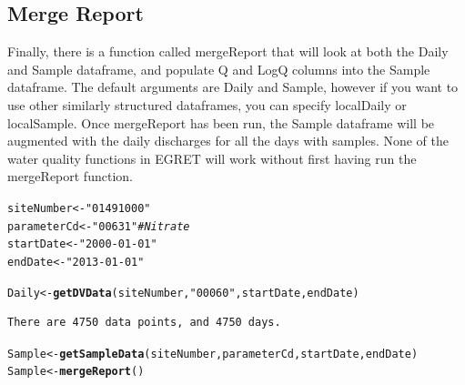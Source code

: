 \documentclass[a4paper,11pt]{article}\usepackage[]{graphicx}\usepackage[]{color}
\makeatletter
\newcommand{\hlstr}[1]{\textcolor[rgb]{0.192,0.494,0.8}{#1}}%
\newcommand{\hlcom}[1]{\textcolor[rgb]{0.678,0.584,0.686}{\textit{#1}}}%
\newcommand{\hlstd}[1]{\textcolor[rgb]{0.345,0.345,0.345}{#1}}%
\newcommand{\hlkwb}[1]{\textcolor[rgb]{0.69,0.353,0.396}{#1}}%
\newcommand{\hlkwd}[1]{\textcolor[rgb]{0.737,0.353,0.396}{\textbf{#1}}}%
\newenvironment{kframe}{%
 \def\at@end@of@kframe{}%
 \ifinner\ifhmode%
  \def\at@end@of@kframe{\end{minipage}}%
  \begin{minipage}{\columnwidth}%
 \fi\fi%
 \def\FrameCommand##1{\hskip\@totalleftmargin \hskip-\fboxsep
 \colorbox{shadecolor}{##1}\hskip-\fboxsep
     \hskip-\linewidth \hskip-\@totalleftmargin \hskip\columnwidth}%
 \MakeFramed {\advance\hsize-\width
   \@totalleftmargin\z@ \linewidth\hsize
   \@setminipage}}%
 {\par\unskip\endMakeFramed%
 \at@end@of@kframe}
\newenvironment{knitrout}{}{} %
\makeatother
\begin{document}
\subsection{Merge Report}
Finally, there is a function called mergeReport that will look at both the Daily and Sample dataframe, and populate Q and LogQ columns into the Sample dataframe. The default arguments are Daily and Sample, however if you want to use other similarly structured dataframes, you can specify localDaily or localSample. Once mergeReport has been run, the Sample dataframe will be augmented with the daily discharges for all the days with samples.  None of the water quality functions in EGRET will work without first having run the mergeReport function.


\begin{knitrout}
\color{fgcolor}\begin{kframe}
\begin{alltt}
\hlstd{siteNumber} \hlkwb{<-} \hlstr{"01491000"}
\hlstd{parameterCd} \hlkwb{<-} \hlstr{"00631"}  \hlcom{# Nitrate}
\hlstd{startDate} \hlkwb{<-} \hlstr{"2000-01-01"}
\hlstd{endDate} \hlkwb{<-} \hlstr{"2013-01-01"}

\hlstd{Daily} \hlkwb{<-} \hlkwd{getDVData}\hlstd{(siteNumber,} \hlstr{"00060"}\hlstd{, startDate, endDate)}
\end{alltt}
\begin{verbatim}
There are 4750 data points, and 4750 days.
\end{verbatim}
\begin{alltt}
\hlstd{Sample} \hlkwb{<-} \hlkwd{getSampleData}\hlstd{(siteNumber,parameterCd, startDate, endDate)}
\hlstd{Sample} \hlkwb{<-} \hlkwd{mergeReport}\hlstd{()}
\end{alltt}
\begin{verbatim}


\end{verbatim}
\end{kframe}
\end{knitrout}
\end{document}
